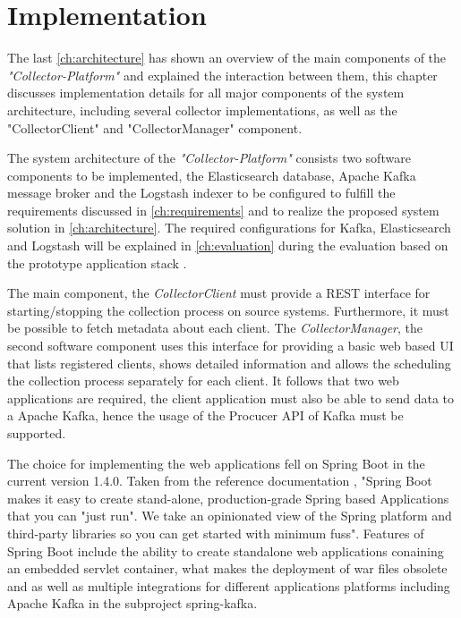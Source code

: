 \chapter{Implementation}
\label{ch:implementation}
The last \autoref{ch:architecture} has shown an overview of the main components of
the \textit{"Collector-Platform"} and explained the interaction between them, this chapter discusses implementation
details for all major components of the system architecture, including several
collector implementations, as well as the "CollectorClient" and "CollectorManager" component.

The system architecture of the \textit{"Collector-Platform"} consists two software components to
be implemented, the Elasticsearch database, Apache Kafka message broker and the Logstash
indexer to be configured to fulfill the requirements discussed in \autoref{ch:requirements} and to realize the
proposed system solution in \autoref{ch:architecture}. The required configurations for Kafka, Elasticsearch and Logstash
will be explained in \autoref{ch:evaluation} during the evaluation based on the prototype application stack .

The main component, the \textit{CollectorClient} must provide a REST interface for starting/stopping the collection process
on source systems. Furthermore, it must be possible to fetch metadata about each client. The \textit{CollectorManager},
the second software component uses this interface for providing a basic web based UI that lists registered
clients, shows detailed information and allows the scheduling the collection process separately
for each client. It follows that two web applications are required, the client application must also be able to
send data to a Apache Kafka, hence the usage of the Procucer API of Kafka must be supported.

The choice for implementing the web applications fell on Spring Boot in the current version 1.4.0. Taken from
the reference documentation \cite{SpringB16}, "Spring Boot makes it easy to create stand-alone, production-grade
Spring based Applications that you can "just run". We take an opinionated view of the Spring platform and
third-party libraries so you can get started with minimum fuss". Features of Spring Boot include the ability to create
standalone web applications conaining an embedded servlet container, what makes the deployment of war files obsolete
and as well as multiple integrations for different applications platforms including Apache Kafka in the subproject spring-kafka.

